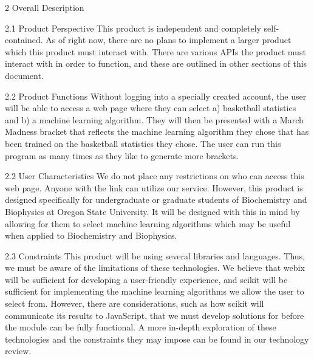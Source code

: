 \documentclass[letterpaper, 10pt,titlepage]{article}
\begin{document}
\newpage
\begin{section}{2 Overall Description}


\begin{subsection}{2.1 Product Perspective}
This product is independent and completely self-contained. As of right now, there are no plans to implement a larger product which this product must interact with. There are various APIs the product must interact with in order to function, and these are outlined in other sections of this document.
\end{subsection}

\begin{subsection}{2.2 Product Functions}
Without logging into a specially created account, the user will be able to access a web page where they can select a) basketball statistics and b) a machine learning algorithm. They will then be presented with a March Madness bracket that reflects the machine learning algorithm they chose that has been trained on the basketball statistics they chose. The user can run this program as many times as they like to generate more brackets. 
\end{subsection}

\begin{subsection}{2.2 User Characteristics}
We do not place any restrictions on who can access this web page. Anyone with the link can utilize our service. However, this product is designed specifically for undergraduate or graduate students of Biochemistry and Biophysics at Oregon State University. It will be designed with this in mind by allowing for them to select machine learning algorithms which may be useful when applied to Biochemistry and Biophysics. 
\end{subsection}

\begin{subsection}{2.3 Constraints}
This product will be using several libraries and languages. Thus, we must be aware of the limitations of these technologies. We believe that webix will be sufficient for developing a user-friendly experience, and scikit will be sufficient for implementing the machine learning algorithms we allow the user to select from. However, there are considerations, such as how scikit will communicate its results to JavaScript, that we must develop solutions for before the module can be fully functional. A more in-depth exploration of these technologies and the constraints they may impose can be found in our technology review. 
\end{subsection}


\end{section}
\end{document}
